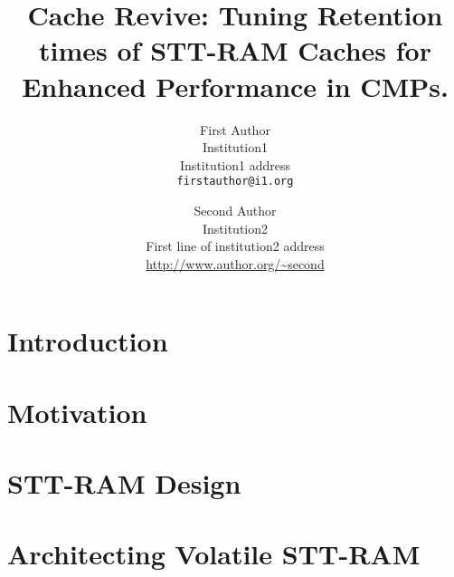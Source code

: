 \documentclass[12pt,letterpaper]{article}
\begin{document}
\title{Cache Revive: Tuning Retention times of STT-RAM Caches for Enhanced
Performance in CMPs.}

\author{First Author\\
Institution1\\
Institution1 address\\
{\tt\small firstauthor@i1.org}
\and
Second Author\\
Institution2\\
First line of institution2 address\\
{\small\url{http://www.author.org/~second}}
}

\maketitle

\begin{abstract}

\end{abstract}
\section{Introduction} \label{sec:intro}

\section{Motivation} \label{sec:motivation}

\section{STT-RAM Design} \label{sec:design}

\section{Architecting Volatile STT-RAM} \label{sec:implementation}

\end{document}
